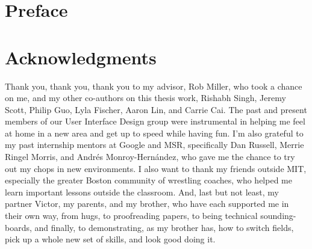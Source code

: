\cleardoublepage

\section*{Preface}


\cleardoublepage

\section*{Acknowledgments}

Thank you, thank you, thank you to my advisor, Rob Miller, who took a chance on me, and my other co-authors on this thesis work, Rishabh Singh, Jeremy Scott, Philip Guo, Lyla Fischer, Aaron Lin, and Carrie Cai. The past and present members of our User Interface Design group were instrumental in helping me feel at home in a new area and get up to speed while having fun. I'm also grateful to my past internship mentors at Google and MSR, specifically Dan Russell, Merrie Ringel Morris, and Andr\'{e}s Monroy-Hern\'{a}ndez, who gave me the chance to try out my chops in new environments. I also want to thank my friends outside MIT, especially the greater Boston community of wrestling coaches, who helped me learn important lessons outside the classroom. And, last but not least, my partner Victor, my parents, and my brother, who have each supported me in their own way, from hugs, to proofreading papers, to being technical sounding-boards, and finally, to demonstrating, as my brother has, how to switch fields, pick up a whole new set of skills, and look good doing it.




\begin{comment}
There are countless individuals who have helped me in ways, large and small, complete this particular marathon. 

I thank my father for inviting me to think with him about interesting problems and principles in electrical engineering and computer science (even while we were in the middle of a Saturday morning jog through town when I was growing up), for teaching me how to program, for helping me learn new concepts by explaining them to him, and for providing emotional support throughout my time becoming an engineer. 

I thank my mother for helping me put together science fair boards at the last minute, copy-editing my paper drafts, and listening to my many updates about life and drama at the Institute.

I thank my brother for demonstrating how to completely switch fields of expertise, become a computer scientist and software developer, and look good doing it.

I thank my partner, Victor, for making my final year of graduate school so much fun, giving me encouraging pep-talks when I was felt down, and reminding me to "squeeze limes" and do what needs to be done, even when I did not want to.
\end{comment}

